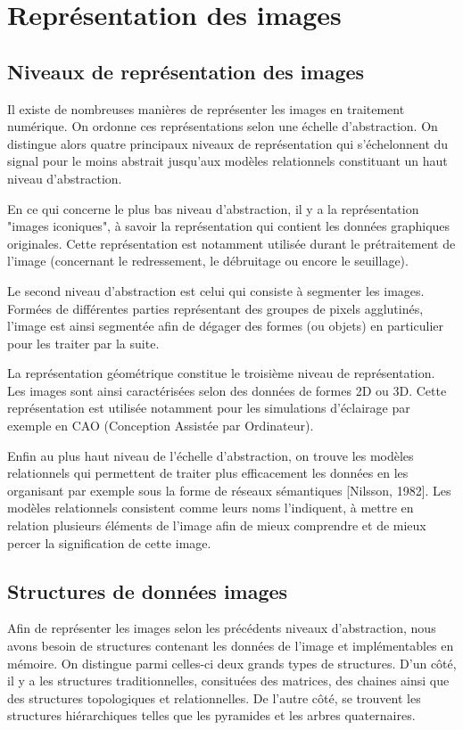 \documentclass[]{report}
\begin{document}

  \chapter{Repr\'esentation des images} %
	\label{cha:repr'esentation_des_images}


    \section{Niveaux de repr\'esentation des images} %
    \label{sec:niveaux_de_repr'esentation_des_images}
  		Il existe de nombreuses manières de représenter les images en traitement numérique. On ordonne ces représentations selon une échelle d'abstraction. On distingue alors quatre principaux niveaux de représentation qui s'échelonnent du signal pour le moins abstrait jusqu'aux modèles relationnels constituant un haut niveau d'abstraction.

      En ce qui concerne le plus bas niveau d'abstraction, il y a la représentation "images iconiques", à savoir la représentation qui contient les données graphiques originales. Cette représentation est notamment utilisée durant le prétraitement de l'image (concernant le redressement, le débruitage ou encore le seuillage).

      Le second niveau d'abstraction est celui qui consiste à segmenter les images. Formées de différentes parties représentant des groupes de pixels agglutinés, l'image est ainsi segmentée afin de dégager des formes (ou objets) en particulier pour les traiter par la suite.

      La représentation géométrique constitue le troisième niveau de représentation. Les images sont ainsi caractérisées selon des données de formes 2D ou 3D. Cette représentation est utilisée notamment pour les simulations d'éclairage par exemple en CAO (Conception Assistée par Ordinateur).

      Enfin au plus haut niveau de l'échelle d'abstraction, on trouve les modèles relationnels qui permettent de traiter plus efficacement les données en les organisant par exemple sous la forme de réseaux sémantiques [Nilsson, 1982]. Les modèles relationnels consistent comme leurs noms l'indiquent, à mettre en relation plusieurs éléments de l'image afin de mieux comprendre et de mieux percer la signification de cette image.


    \section{Structures de donn\'ees images} %
    \label{sec:structures_de_donn'ees_images}
      Afin de représenter les images selon les précédents niveaux d'abstraction, nous avons besoin de structures contenant les données de l'image et implémentables en mémoire. On distingue parmi celles-ci deux grands types de structures. D'un côté, il y a les structures traditionnelles, consituées des matrices, des chaines ainsi que des structures topologiques et relationnelles. De l'autre côté, se trouvent les structures hiérarchiques telles que les pyramides et les arbres quaternaires.
\end{document}

